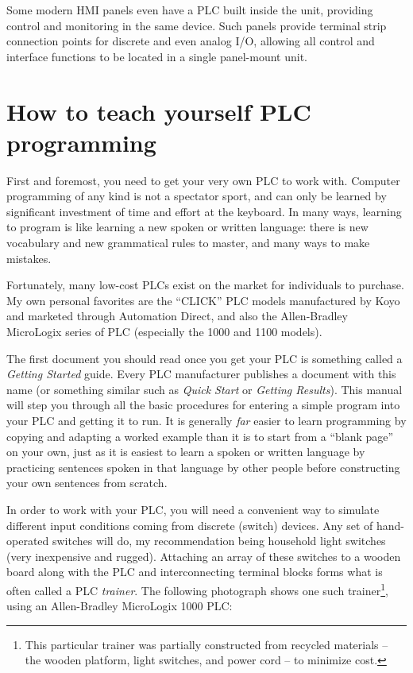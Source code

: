 Some modern HMI panels even have a PLC built inside the unit, providing control and monitoring in the same device.  Such panels provide terminal strip connection points for discrete and even analog I/O, allowing all control and interface functions to be located in a single panel-mount unit.







\filbreak
\section{How to teach yourself PLC programming}

First and foremost, you need to get your very own PLC to work with.  Computer programming of any kind is not a spectator sport, and can only be learned by significant investment of time and effort at the keyboard.  In many ways, learning to program is like learning a new spoken or written language: there is new vocabulary and new grammatical rules to master, and many ways to make mistakes.

Fortunately, many low-cost PLCs exist on the market for individuals to purchase.  My own personal favorites are the ``CLICK'' PLC models manufactured by Koyo and marketed through Automation Direct, and also the Allen-Bradley MicroLogix series of PLC (especially the 1000 and 1100 models).    

The first document you should read once you get your PLC is something called a \textit{Getting Started} guide.  Every PLC manufacturer publishes a document with this name (or something similar such as \textit{Quick Start} or \textit{Getting Results}).  This manual will step you through all the basic procedures for entering a simple program into your PLC and getting it to run.  It is generally \textit{far} easier to learn programming by copying and adapting a worked example than it is to start from a ``blank page'' on your own, just as it is easiest to learn a spoken or written language by practicing sentences spoken in that language by other people before constructing your own sentences from scratch.

In order to work with your PLC, you will need a convenient way to simulate different input conditions coming from discrete (switch) devices.  Any set of hand-operated switches will do, my recommendation being household light switches (very inexpensive and rugged).  Attaching an array of these switches to a wooden board along with the PLC and interconnecting terminal blocks forms what is often called a PLC \textit{trainer}.  The following photograph shows one such trainer\footnote{This particular trainer was partially constructed from recycled materials -- the wooden platform, light switches, and power cord -- to minimize cost.}, using an Allen-Bradley MicroLogix 1000 PLC: 

